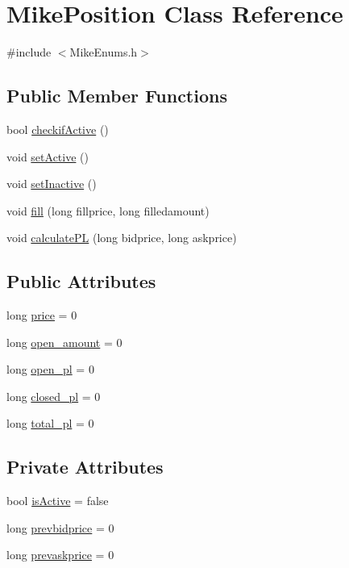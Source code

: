 \hypertarget{class_mike_position}{}\section{Mike\+Position Class Reference}
\label{class_mike_position}


{\ttfamily \#include $<$Mike\+Enums.\+h$>$}

\subsection*{Public Member Functions}
\begin{DoxyCompactItemize}
\item 
bool \hyperlink{class_mike_position_a001a334e6a9945ab9f90cf90577b40ef}{checkif\+Active} ()
\item 
void \hyperlink{class_mike_position_aa9c446479b6ca2c15bd43aa6680a1708}{set\+Active} ()
\item 
void \hyperlink{class_mike_position_a8f71fd363bb8ef7784977f6bf2e66362}{set\+Inactive} ()
\item 
void \hyperlink{class_mike_position_a3f6b57b4b2a95da75c7eb9fd5c70a662}{fill} (long fillprice, long filledamount)
\item 
void \hyperlink{class_mike_position_ac0717525b293e8c2b65c515c1d5e191b}{calculate\+PL} (long bidprice, long askprice)
\end{DoxyCompactItemize}
\subsection*{Public Attributes}
\begin{DoxyCompactItemize}
\item 
long \hyperlink{class_mike_position_a9b469c8e14288f1452a8dbfb16880271}{price} = 0
\item 
long \hyperlink{class_mike_position_a824c9f75ed685b79cfc6d577cfbbeaa7}{open\+\_\+amount} = 0
\item 
long \hyperlink{class_mike_position_ad3029cfaf331381cf80ffdc6584b5041}{open\+\_\+pl} = 0
\item 
long \hyperlink{class_mike_position_a89f595abfc3de94ab79d46c9abdfbb48}{closed\+\_\+pl} = 0
\item 
long \hyperlink{class_mike_position_aade9ed9ba587b634d3b21ab9e08a66f9}{total\+\_\+pl} = 0
\end{DoxyCompactItemize}
\subsection*{Private Attributes}
\begin{DoxyCompactItemize}
\item 
bool \hyperlink{class_mike_position_a71ffc762cb81d7b32a68294ede633f0d}{is\+Active} = false
\item 
long \hyperlink{class_mike_position_a64947b8606224019039dc69b5ae0c554}{prevbidprice} = 0
\item 
long \hyperlink{class_mike_position_a9380b47f206f3e967667bdea255f2c51}{prevaskprice} = 0
\end{DoxyCompactItemize}

